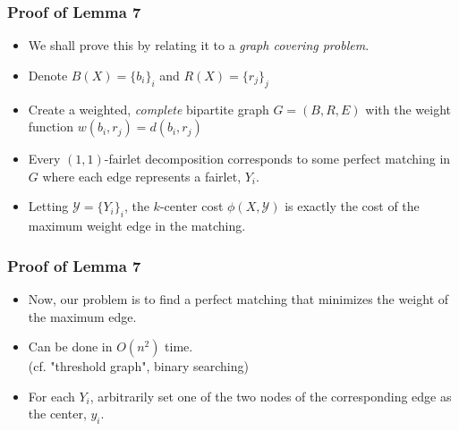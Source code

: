 \documentclass{beamer}
\begin{document}
\begin{frame}
\frametitle{Proof of Lemma 7}

\begin{itemize}
	\item We shall prove this by relating it to a {\it graph covering problem}.
	
	\item Denote $B(X) = \{b_i\}_i$ and $R(X) = \{r_j\}_j$
	
	\item Create a weighted, {\it complete} bipartite graph $G = (B, R, E)$ with the weight function $w(b_i, r_j) = d(b_i, r_j)$
	
	\item Every $(1, 1)$-fairlet decomposition corresponds to some \alert{perfect matching} in $G$ where each edge represents a fairlet, $Y_i$.
	
	\item Letting $\mathcal{Y} = \{Y_i\}_i$, the $k$-center cost $\phi(X, \mathcal{Y})$ is exactly the cost of the maximum weight edge in the matching.
\end{itemize}

\end{frame}



\begin{frame}
\frametitle{Proof of Lemma 7}

\begin{itemize}
	\item Now, our problem is to find a perfect matching that minimizes the weight of the maximum edge.
	
	\item Can be done in $O(n^2)$ time.\\
	(cf. "threshold graph", binary searching)	
	
	\item For each $Y_i$, arbitrarily set one of the two nodes of the corresponding edge as the center, $y_i$.
\end{itemize}

\end{frame}

\end{document}
